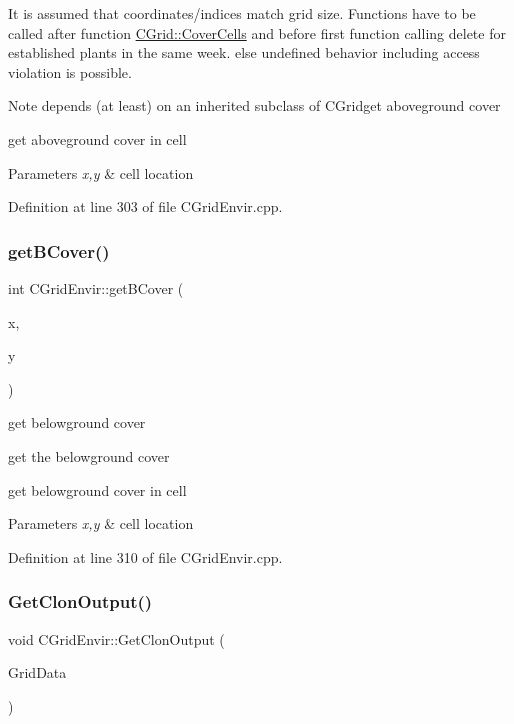 It is assumed that coordinates/indices match grid size. Functions have to be called after function \mbox{\hyperlink{class_c_grid_a4192c45a00e1b07e475e0f20bc87e67d}{C\+Grid\+::\+Cover\+Cells}} and before first function calling delete for established plants in the same week. else undefined behavior including access violation is possible. \begin{DoxyNote}{Note}
depends (at least) on an inherited subclass of C\+Gridget aboveground cover
\end{DoxyNote}
get aboveground cover in cell 
\begin{DoxyParams}{Parameters}
{\em x,y} & cell location \\
\hline
\end{DoxyParams}


Definition at line 303 of file C\+Grid\+Envir.\+cpp.

\mbox{\label{class_c_grid_envir_af90026b4979069e8b4aa262ffa124190}} 
\subsubsection{\texorpdfstring{getBCover()}{getBCover()}}
{\footnotesize\ttfamily int C\+Grid\+Envir\+::get\+B\+Cover (\begin{DoxyParamCaption}\item[{int}]{x,  }\item[{int}]{y }\end{DoxyParamCaption})}



get belowground cover 

get the belowground cover

get belowground cover in cell 
\begin{DoxyParams}{Parameters}
{\em x,y} & cell location \\
\hline
\end{DoxyParams}


Definition at line 310 of file C\+Grid\+Envir.\+cpp.

\mbox{\label{class_c_grid_envir_a858b8e8281f1a80dc0b0a72b2b9a4346}} 
\subsubsection{\texorpdfstring{GetClonOutput()}{GetClonOutput()}}
{\footnotesize\ttfamily void C\+Grid\+Envir\+::\+Get\+Clon\+Output (\begin{DoxyParamCaption}\item[{\mbox{\hyperlink{struct_s_grid_out}{S\+Grid\+Out}} \&}]{Grid\+Data }\end{DoxyParamCaption})}



